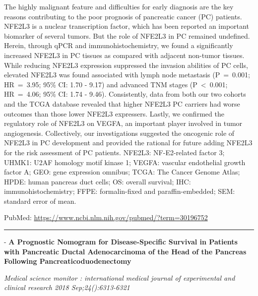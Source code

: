 \documentclass[]{article}
\begin{document}
The highly malignant feature and difficulties for early diagnosis are
the key reasons contributing to the poor prognosis of pancreatic cancer
(PC) patients. NFE2L3 is a nuclear transcription factor, which has been
reported an important biomarker of several tumors. But the role of
NFE2L3 in PC remained undefined. Herein, through qPCR and
immunohistochemistry, we found a significantly increased NFE2L3 in PC
tissues as compared with adjacent non-tumor tissues. While reducing
NFE2L3 expression suppressed the invasion abilities of PC cells,
elevated NFE2L3 was found associated with lymph node metastasis
(P~=~0.001; HR~=~3.95; 95\% CI: 1.70 - 9.17) and advanced TNM stages
(P~\textless{}~0.001; HR~=~4.06; 95\% CI: 1.74 - 9.46). Consistently,
data from both our two cohorts and the TCGA database revealed that
higher NFE2L3 PC carriers had worse outcomes than those lower NFE2L3
expressers. Lastly, we confirmed the regulatory role of NFE2L3 on VEGFA,
an important player involved in tumor angiogenesis. Collectively, our
investigations suggested the oncogenic role of NFE2L3 in PC development
and provided the rational for future adding NFE2L3 for the risk
assessment of PC patients. NFE2L3: NF-E2-related factor 3; UHMK1: U2AF
homology motif kinase 1; VEGFA: vascular endothelial growth factor A;
GEO: gene expression omnibus; TCGA: The Cancer Genome Atlas; HPDE: human
pancreas duct cells; OS: overall survival; IHC: immunohistochemistry;
FFPE: formalin-fixed and paraffin-embedded; SEM: standard error of mean.

PubMed: \url{https://www.ncbi.nlm.nih.gov/pubmed/?term=30196752}

{}

{}

\begin{center}\rule{0.5\linewidth}{\linethickness}\end{center}

 - \textbf{A Prognostic Nomogram for Disease-Specific Survival in
Patients with Pancreatic Ductal Adenocarcinoma of the Head of the
Pancreas Following Pancreaticoduodenectomy}

\emph{Medical science monitor : international medical journal of
experimental and clinical research 2018 Sep;24():6313-6321}
\end{document}
